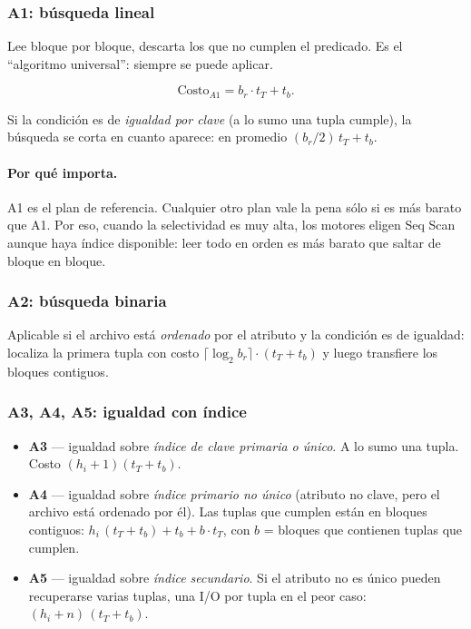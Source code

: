 \documentclass[11pt,a4paper]{article}
\begin{document}
\subsubsection*{A1: búsqueda lineal}

Lee bloque por bloque, descarta los que no cumplen el predicado. Es el
``algoritmo universal'': siempre se puede aplicar.

\[
\text{Costo}_{A1} = b_r \cdot t_T + t_b.
\]

Si la condición es de \emph{igualdad por clave} (a lo sumo una tupla
cumple), la búsqueda se corta en cuanto aparece: en promedio
$(b_r/2)\,t_T + t_b$.

\paragraph{Por qué importa.} A1 es el plan de referencia. Cualquier otro
plan vale la pena sólo si es más barato que A1. Por eso, cuando la
selectividad es muy alta, los motores eligen Seq Scan aunque haya índice
disponible: leer todo en orden es más barato que saltar de bloque en
bloque.

\subsubsection*{A2: búsqueda binaria}

Aplicable si el archivo está \emph{ordenado} por el atributo y la condición
es de igualdad: localiza la primera tupla con costo
$\lceil \log_2 b_r \rceil \cdot (t_T + t_b)$ y luego transfiere los bloques
contiguos.

\subsubsection*{A3, A4, A5: igualdad con índice}

\begin{itemize}
    \item \textbf{A3} --- igualdad sobre \emph{índice de clave primaria o
    único}. A lo sumo una tupla. Costo $(h_i + 1)(t_T + t_b)$.
    \item \textbf{A4} --- igualdad sobre \emph{índice primario no único}
    (atributo no clave, pero el archivo está ordenado por él). Las tuplas
    que cumplen están en bloques contiguos:
    $h_i\,(t_T + t_b) + t_b + b \cdot t_T$, con $b$ = bloques que
    contienen tuplas que cumplen.
    \item \textbf{A5} --- igualdad sobre \emph{índice secundario}. Si el
    atributo no es único pueden recuperarse varias tuplas, una I/O por
    tupla en el peor caso: $(h_i + n)\,(t_T + t_b)$.
\end{itemize}
\end{document}
